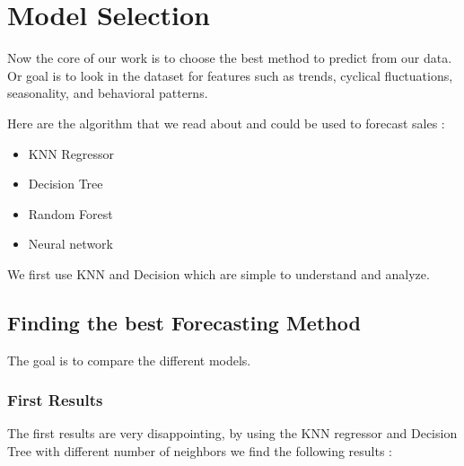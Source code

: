\documentclass{report}
\begin{document}
\chapter{Model Selection}

Now the core of our work is to choose the best method to predict from our data. Or goal is to look in the dataset for features such as trends, cyclical fluctuations, seasonality, and behavioral patterns.


Here are the algorithm that we read about and could be used to forecast sales :
\begin{itemize}
\item KNN Regressor
\item Decision Tree
\item Random Forest
\item Neural network
\end{itemize}

We first use KNN and Decision which are simple to understand and analyze. 

\section{Finding the best Forecasting Method}

The goal is to compare the different models.

\subsection{First Results}

The first results are very disappointing, by using the KNN regressor and Decision Tree with different number of neighbors we find the following results :
\end{document}
